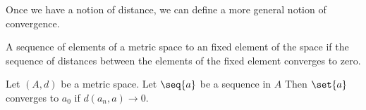 
\sbasic















\sstart
{}


Once we have a notion of distance, we
can define a more general notion of
convergence.


A sequence of elements of a metric
space 
to an fixed element of the space if the
sequence of distances between the
elements of the fixed element converges
to zero.


Let $(A, d)$ be a metric space.
Let $\seq{a}$ be a sequence in $A$
Then $\set{a}$ converges to
$a_0$ if $d(a_n, a) \to 0$.
\strats
